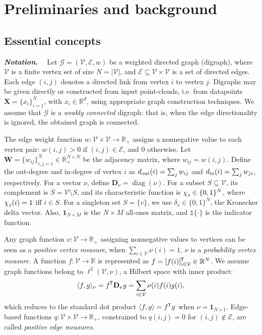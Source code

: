 \documentclass[10pt]{article} %
\def\rmD{{\mathbf{D}}}
\def\rmW{{\mathbf{W}}}
\def\gV{{\mathcal{V}}}
\newcommand{\diag}[1]{\operatorname{diag}(#1)}
\renewcommand*{\top}{{\mkern-1.4mu\mathsf{T}}}
\newcommand{\chivec}[1] {{\chi_{\raisebox{-0.15em}{\scalebox{0.6}{$#1$}}}}}
\newcommand{\inlinetitle}[2]{\noindent\textbf{\textit{#1}{#2}}~~}
\newcommand{\one}   		{\boldsymbol{1}}
\begin{document}
\section{Preliminaries and background}
\label{sec:background}

\subsection{Essential concepts}
\label{sec:essential-concepts}

\inlinetitle{Notation}{.}%
Let $\mathcal{G} = (\gV, \mathcal{E}, w)$ be a weighted directed graph (digraph), where $\gV$ is a finite vertex set of size $N = |\gV|$, and $\mathcal{E} \subseteq \gV \times \gV$ is a set of directed edges. Each edge $(i, j)$ denotes a directed link from vertex $i$ to vertex $j$. Digraphs may be given directly or constructed from input point-clouds, i.e. from datapoints $\boldsymbol{X} = \{x_i\}_{i=1}^N$, with $x_i \in \mathbb{R}^d$, using appropriate graph construction techniques. We assume that $\mathcal{G}$  is a \emph{weakly connected} digraph: that is, when the edge directionality is ignored, the obtained graph is connected.

The edge weight function $w: \gV \times \gV \to \mathbb{R}_+$ assigns a nonnegative value to each vertex pair: $w(i,j) > 0$ if $(i,j) \in \mathcal{E}$, and $0$ otherwise. Let $\rmW = \{w_{ij}\}_{i,j=1}^N \in \mathbb{R}_+^{N \times N}$ be the adjacency matrix, where $w_{ij} = w(i,j)$. Define the out-degree and in-degree of vertex $i$ as $d_\textnormal{out}(i) = \sum_j w_{ij}$ and $d_\textnormal{in}(i) = \sum_j w_{ji}$, respectively. For a vector $\nu$, define $\rmD_\nu = \diag{\nu}$. For a subset $S \subseteq \gV$, its complement is $\bar{S} = \gV \setminus S$, and its characteristic function is $\chivec{S} \in \{0,1\}^N$, where $\chivec{S}(i) = 1$ iff $i \in S$. For a singleton set $S = \{v\}$, we use $\delta_v \in \{0,1\}^N$, the Kronecker delta vector. Also, $\one_{N \times M}$ is the $N \times M$ all-ones matrix, and $\mathds{1}\{\cdot\}$ is the indicator function.

Any graph function $\nu: \gV \to \mathbb{R}_+$ assigning nonnegative values to vertices can be seen as a \emph{positive vertex measure}, when $\sum_{i \in \gV} \nu(i) = 1$, $\nu$ is a \emph{probability vertex measure}. A function $f : \gV \to \mathbb{R}$ is represented as $f = [f(i)]_{i \in \gV}^\top \in \mathbb{R}^N$. We assume graph functions belong to $\ell^2(\gV, \nu)$, a Hilbert space with inner product:
\begin{equation}
  \langle f, g \rangle_{\nu} = f^\top \rmD_{\nu} g = \sum_{i \in \gV} \nu(i) f(i) g(i),
\end{equation}
which reduces to the standard dot product $\langle f, g \rangle = f^\top g$ when $\nu = \one_{N \times 1}$. Edge-based functions $q: \gV \times \gV \to \mathbb{R}_+$, constrained to $q(i,j) = 0$ for $(i,j) \notin \mathcal{E}$, are called \emph{positive edge measures}.
\end{document}
